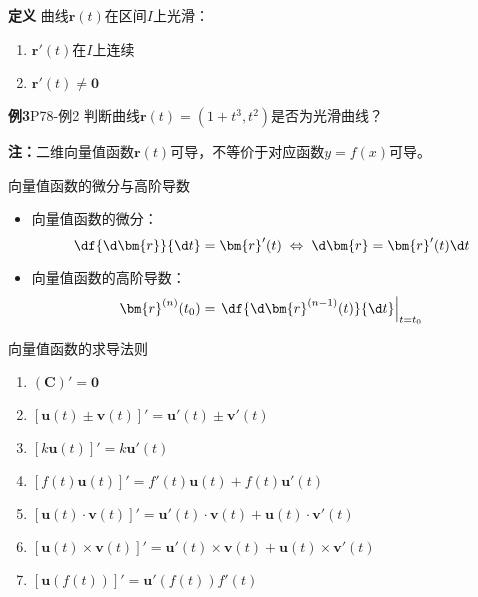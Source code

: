 \begin{frame}
	\linespread{1.2}
	\begin{block}{\bf 定义}
		{\bb 曲线$\bm{r}(t)$在区间$I$上光滑：}
		\begin{enumerate}
		  \item $\bm{r}'(t)$在$I$上连续
		  \item $\bm{r}'(t)\ne \bm{0}$
		\end{enumerate}
	\end{block}
	\pause\bigskip
	\begin{exampleblock}{{\bf 例3}\hfill P78-例2}
		判断曲线$\bm{r}(t)=(1+t^3,t^2)$是否为光滑曲线？
	\end{exampleblock}\pause
	\alert{{\bf 注：}二维向量值函数$\bm{r}(t)$可导，不等价于对应函数$y=f(x)$可导。}
\end{frame}

\begin{frame}{向量值函数的微分与高阶导数}
	\linespread{1.5}\pause
	\begin{itemize}
	  \item {\bb 向量值函数的微分：}\pause
	  $$\df{\d\bm{r}}{\d t}=\bm{r}'(t)\;\Leftrightarrow\;
	  \d\bm{r}=\bm{r}'(t)\d t$$\pause
	  \vspace{-1em}
	  \item {\bb 向量值函数的高阶导数：}
	  $$\bm{r}^{(n)}(t_0)=\left.\df{\d\bm{r}^{(n-1)}(t)}{\d t}\right|_{t=t_0}$$
	\end{itemize}
\end{frame}

\begin{frame}{向量值函数的求导法则}
	\linespread{1.4}
	\begin{enumerate}\pause 
	  \item $(\bm{C})'=\bm{0}$\pause 
	  \item $[\bm{u}(t)\pm\bm{v}(t)]'=\bm{u}'(t)\pm\bm{v}'(t)$\pause 
	  \item $[k\bm{u}(t)]'=k\bm{u}'(t)$\pause 
	  \item $[f(t)\bm{u}(t)]'=f'(t)\bm{u}(t)+f(t)\bm{u}'(t)$\pause 
	  \item \alert{$[\bm{u}(t)\cdot\bm{v}(t)]'=\bm{u}'(t)\cdot\bm{v}(t)
	  +\bm{u}(t)\cdot\bm{v}'(t)$}\pause 
	  \item \alert{$[\bm{u}(t)\times\bm{v}(t)]'=\bm{u}'(t)\times\bm{v}(t)
	  +\bm{u}(t)\times\bm{v}'(t)$}\pause 
	  \item $[\bm{u}(f(t))]'=\bm{u}'(f(t))f'(t)$\pause 
	\end{enumerate}
\end{frame}

